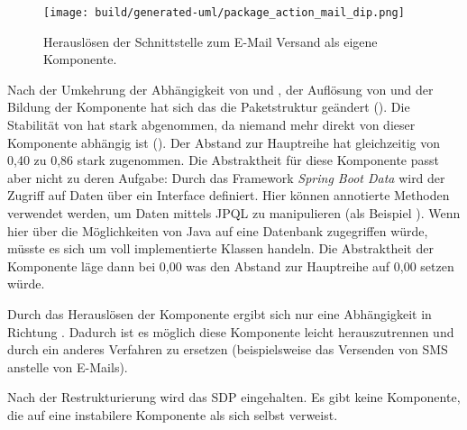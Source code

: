 \begin{figure}
  \centering
  \texttt{[image: build/generated-uml/package\_action\_mail\_dip.png]}
   \caption{Herauslösen der Schnittstelle zum E-Mail Versand als eigene Komponente.}
   \label{fig:package_action_mail_dip}
\end{figure}

Nach der Umkehrung der Abhängigkeit von  und , der Auflösung von  und der Bildung der Komponente  hat sich das die Paketstruktur geändert (). Die Stabilität von  hat stark abgenommen, da niemand mehr direkt von dieser Komponente abhängig ist (). Der Abstand zur Hauptreihe hat gleichzeitig von 0,40 zu 0,86 stark zugenommen. Die Abstraktheit für diese Komponente passt aber nicht zu deren Aufgabe: Durch das Framework \textit{Spring Boot Data} wird der Zugriff auf Daten über ein Interface definiert. Hier können annotierte Methoden verwendet werden, um Daten mittels \ac{JPQL} zu manipulieren (als Beispiel ). Wenn hier \zb über die Möglichkeiten von Java auf eine Datenbank zugegriffen würde, müsste es sich um voll implementierte Klassen handeln. Die Abstraktheit der Komponente  läge dann bei 0,00 was den Abstand zur Hauptreihe auf 0,00 setzen würde.

Durch das Herauslösen der Komponente  ergibt sich nur eine Abhängigkeit in Richtung . Dadurch ist es möglich diese Komponente leicht herauszutrennen und durch ein anderes Verfahren zu ersetzen (beispielsweise das Versenden von SMS anstelle von E-Mails). 

Nach der Restrukturierung wird das \ac{SDP} eingehalten. Es gibt keine Komponente, die auf eine instabilere Komponente als sich selbst verweist.

